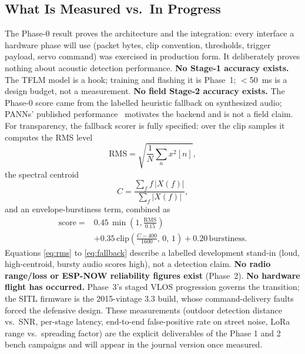 \documentclass[conference]{IEEEtran}
\begin{document}
\subsection{What Is Measured vs.\ In Progress}
\label{sec:measured}

The Phase-0 result proves the architecture and the integration: every
interface a hardware phase will use (packet bytes, clip convention,
thresholds, trigger payload, servo command) was exercised in
production form. It deliberately proves nothing about acoustic
detection performance. \textbf{No Stage-1 accuracy exists.} The TFLM
model is a hook; training and flashing it is Phase~1; $<$50~ms is a
design budget, not a measurement. \textbf{No field Stage-2 accuracy
exists.} The Phase-0 score came from the labelled heuristic fallback
on synthesized audio; PANNs' published performance~\cite{panns}
motivates the backend and is not a field claim. For transparency, the
fallback scorer is fully specified: over the clip samples it computes
the RMS level
\begin{equation}
\label{eq:rms}
\mathrm{RMS} = \sqrt{\frac{1}{N}\sum_{n} x^2[n]},
\end{equation}
the spectral centroid
\begin{equation}
\label{eq:centroid}
C = \frac{\sum_{f} f\,\lvert X(f)\rvert}{\sum_{f} \lvert X(f)\rvert},
\end{equation}
and an envelope-burstiness term, combined as
\begin{equation}
\label{eq:fallback}
\begin{split}
\mathrm{score} = {}& 0.45\,\min\!\left(1, \frac{\mathrm{RMS}}{0.15}\right) \\
& + 0.35\,\mathrm{clip}\!\left(\frac{C - 400}{1600},\,0,\,1\right)
+ 0.20\,\mathrm{burstiness}.
\end{split}
\end{equation}
Equations \eqref{eq:rms} to \eqref{eq:fallback} describe a labelled
development stand-in (loud, high-centroid, bursty audio scores high),
not a detection claim. \textbf{No radio range/loss or ESP-NOW
reliability figures exist} (Phase~2). \textbf{No hardware flight has
occurred.} Phase~3's staged VLOS progression governs the transition;
the SITL firmware is the 2015-vintage 3.3 build, whose
command-delivery faults forced the defensive design. These
measurements (outdoor detection distance vs.\ SNR, per-stage latency,
end-to-end false-positive rate on street noise, LoRa range vs.\
spreading factor) are the explicit deliverables of the Phase 1 and 2
bench campaigns and will appear in the journal version once measured.
\end{document}
